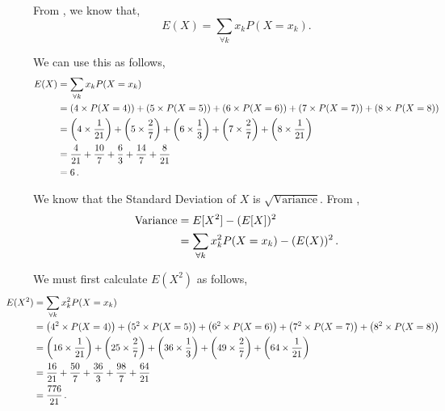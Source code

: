 \begin{subquestions}
\begin{subsubquestions}

\subsubquestion

From , we know that,
\begin{equation}
	E(X)= \sum_{\forall k} x_k P(X=x_k). 
\end{equation}

We can use this as follows,
\begin{align}
	E(X) & = \sum_{\forall k} x_k P(X=x_k) \nonumber \\
	     & = \left(4 \times P(X=4)\right) + \left(5 \times P(X=5)\right) + \left(6 \times P(X=6)\right) + \left(7 \times P(X=7)\right) + \left(8 \times P(X=8) \right) \nonumber \\
	     & = \left(4 \times \frac{1}{21}\right) + \left(5 \times \frac{2}{7}\right) + \left(6 \times \frac{1}{3}\right) + \left(7 \times \frac{2}{7}\right) + \left(8 \times \frac{1}{21} \right) \nonumber \\
	     & = \frac{4}{21} + \frac{10}{7} + \frac{6}{3} + \frac{14}{7} + \frac{8}{21} \nonumber \\
	     & = 6\,.
\end{align}


\subsubquestion

We know that the Standard Deviation of $X$ is $\sqrt{\text{Variance}}$. From , 
\begin{align}
	\text{Variance} & = E[X^2] - (E[X])^2 \nonumber \\
	           & = \sum_{\forall k} x_k^2 P(X=x_k) - (E(X))^2 \,.
\end{align}

We must first calculate $E(X^2)$ as follows,
\begin{align}
	\hspace{-100pt}
	E(X^2) & = \sum_{\forall k} x_k^2 P(X=x_k) \nn \\
	       & = \left(4^2 \times P(X=4)\right) + \left(5^2 \times P(X=5)\right) + \left(6^2 \times P(X=6)\right) + \left(7^2 \times P(X=7)\right) + \left(8^2 \times P(X=8) \right) \nn \\
	       & = \left(16 \times \frac{1}{21}\right) + \left(25 \times \frac{2}{7}\right) + \left(36 \times \frac{1}{3}\right) + \left(49 \times \frac{2}{7}\right) + \left(64 \times \frac{1}{21} \right) \nn \\
	       & = \frac{16}{21} + \frac{50}{7} + \frac{36}{3} + \frac{98}{7} + \frac{64}{21} \nn \\
	       & = \frac{776}{21} \,.
\end{align}


\end{subsubquestions}
\end{subquestions}
